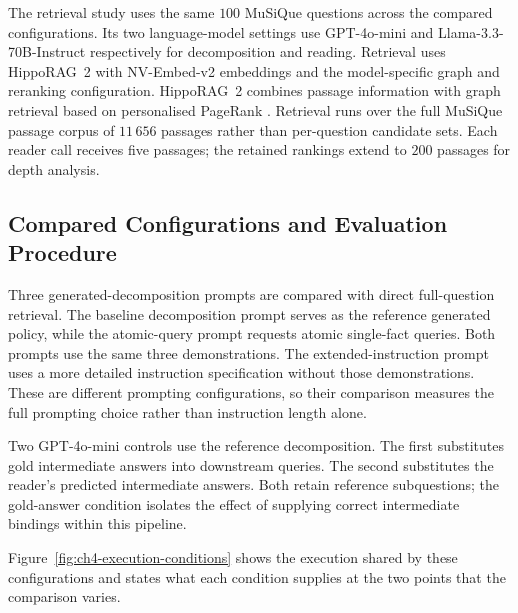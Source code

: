 The retrieval study uses the same $100$ MuSiQue questions across the compared
configurations. Its two language-model settings use GPT-4o-mini and
Llama-3.3-70B-Instruct respectively for decomposition and reading. Retrieval
uses HippoRAG~2 with NV-Embed-v2 embeddings and the model-specific graph and
reranking configuration. HippoRAG~2 combines passage information with graph
retrieval based on personalised PageRank \cite{gutierrez2025hipporag2}. Retrieval runs
over the full MuSiQue passage corpus of $11\,656$ passages rather than
per-question candidate sets.
Each reader call receives five passages; the retained rankings extend to $200$
passages for depth analysis.

\subsection{Compared Configurations and Evaluation Procedure}

Three generated-decomposition prompts are compared with direct full-question
retrieval. The baseline decomposition prompt serves as the reference generated
policy, while the atomic-query prompt requests atomic single-fact queries. Both
prompts use the same three demonstrations. The extended-instruction prompt uses a more detailed
instruction specification without those demonstrations. These are
different prompting configurations, so their comparison measures the full
prompting choice rather than instruction length alone.

Two GPT-4o-mini controls use the reference decomposition. The first substitutes
gold intermediate answers into downstream queries. The second substitutes the
reader's predicted intermediate answers. Both retain reference subquestions;
the gold-answer condition isolates the effect of supplying correct intermediate
bindings within this pipeline.

Figure~\ref{fig:ch4-execution-conditions} shows the execution shared by these
configurations and states what each condition supplies at the two points that
the comparison varies.

